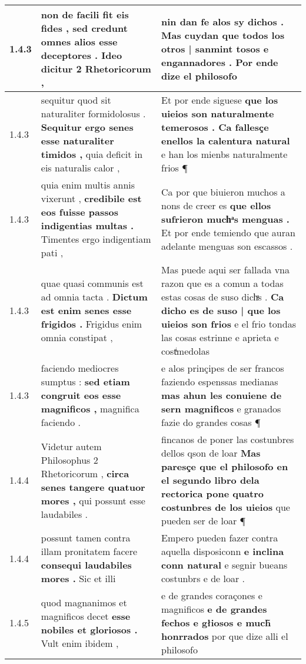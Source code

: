 \begin{tabular}{|p{1cm}|p{6.5cm}|p{6.5cm}|}
1.4.3 & non de facili fit eis fides , \textbf{ sed credunt omnes alios esse deceptores . } Ideo dicitur 2 Rhetoricorum , & nin dan fe alos sy dichos . \textbf{ Mas cuydan que todos los otros | sanmint tosos e engannadores . } Por ende dize el philosofo \\\hline
1.4.3 & sequitur quod sit naturaliter formidolosus . \textbf{ Sequitur ergo senes esse naturaliter timidos , } quia deficit in eis naturalis calor , & Et por ende siguese \textbf{ que los uieios son naturalmente temerosos . Ca fallesçe enellos la calentura natural } e han los mienbs naturalmente frios ¶ \\\hline
1.4.3 & quia enim multis annis vixerunt , \textbf{ credibile est eos fuisse passos indigentias multas . } Timentes ergo indigentiam pati , & Ca por que biuieron muchos a nons de creer es \textbf{ que ellos sufrieron muchͣs menguas . } Et por ende temiendo que auran adelante menguas son escassos . \\\hline
1.4.3 & quae quasi communis est ad omnia tacta . \textbf{ Dictum est enim senes esse frigidos . } Frigidus enim omnia constipat , & Mas puede aqui ser fallada vna razon que es a comun a todas estas cosas de suso dichͣs . \textbf{ Ca dicho es de suso | que los uieios son frios } e el frio tondas las cosas estrinne e aprieta e costͥmedolas \\\hline
1.4.3 & faciendo mediocres sumptus : \textbf{ sed etiam congruit eos esse magnificos , } magnifica faciendo . & e alos prinçipes de ser francos faziendo espenssas medianas \textbf{ mas ahun les conuiene de sern magnificos } e granados fazie do grandes cosas ¶ \\\hline
1.4.4 & Videtur autem Philosophus 2 Rhetoricorum , \textbf{ circa senes tangere quatuor mores , } qui possunt esse laudabiles . & fincanos de poner las costunbres dellos qson de loar \textbf{ Mas paresçe que el philosofo en el segundo libro dela rectorica pone quatro costunbres de los uieios } que pueden ser de loar ¶ \\\hline
1.4.4 & possunt tamen contra illam pronitatem facere \textbf{ consequi laudabiles mores . } Sic et illi & Empero pueden fazer contra aquella disposiconn \textbf{ e inclina conn natural } e segnir bueans costunbrs e de loar . \\\hline
1.4.5 & quod magnanimos et magnificos decet \textbf{ esse nobiles et gloriosos . } Vult enim ibidem , & e de grandes coraçones e magnificos \textbf{ e de grandes fechos e głiosos e much̃ honrrados } por que dize alli el philosofo \\\hline

\end{tabular}
